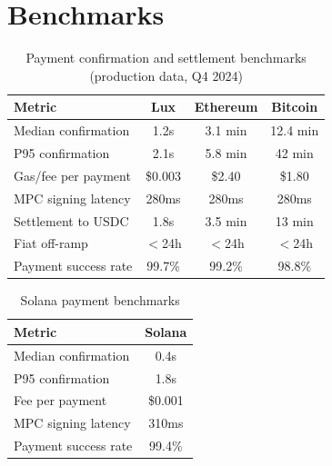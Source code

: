 \section{Benchmarks}

\label{sec:benchmarks}

\begin{table}[htbp]
\centering
\caption{Payment confirmation and settlement benchmarks (production data, Q4 2024)}
\label{tab:benchmarks}
\begin{tabular}{@{}lccc@{}}
\toprule
\textbf{Metric} & \textbf{Lux} & \textbf{Ethereum} & \textbf{Bitcoin} \\
\midrule
Median confirmation      & 1.2s    & 3.1 min  & 12.4 min \\
P95 confirmation         & 2.1s    & 5.8 min  & 42 min \\
Gas/fee per payment      & \$0.003 & \$2.40   & \$1.80 \\
MPC signing latency      & 280ms   & 280ms    & 280ms \\
Settlement to USDC       & 1.8s    & 3.5 min  & 13 min \\
Fiat off-ramp            & $<$24h  & $<$24h   & $<$24h \\
Payment success rate      & 99.7\%  & 99.2\%   & 98.8\% \\
\bottomrule
\end{tabular}
\end{table}

\begin{table}[htbp]
\centering
\caption{Solana payment benchmarks}
\label{tab:solana}
\begin{tabular}{@{}lc@{}}
\toprule
\textbf{Metric} & \textbf{Solana} \\
\midrule
Median confirmation   & 0.4s \\
P95 confirmation      & 1.8s \\
Fee per payment       & \$0.001 \\
MPC signing latency   & 310ms \\
Payment success rate  & 99.4\% \\
\bottomrule
\end{tabular}
\end{table}


